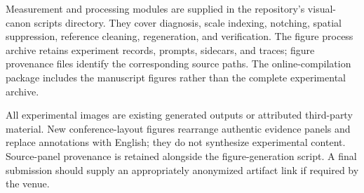 \documentclass[sigplan,10pt,nonacm]{acmart}
\begin{document}
Measurement and processing modules are supplied in the repository's visual-canon scripts directory. They cover diagnosis, scale indexing, notching, spatial suppression, reference cleaning, regeneration, and verification. The figure process archive retains experiment records, prompts, sidecars, and traces; figure provenance files identify the corresponding source paths. The online-compilation package includes the manuscript figures rather than the complete experimental archive.

All experimental images are existing generated outputs or attributed third-party material. New conference-layout figures rearrange authentic evidence panels and replace annotations with English; they do not synthesize experimental content. Source-panel provenance is retained alongside the figure-generation script. A final submission should supply an appropriately anonymized artifact link if required by the venue.
\fi
\end{document}
